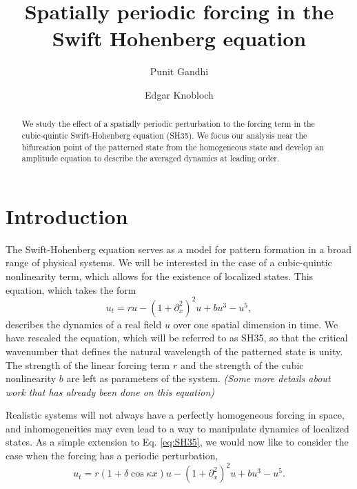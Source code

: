 \documentclass[api,pof,pre,12pt,a4paper]{revtex4-1}
\begin{document}

\title{Spatially periodic forcing in the Swift Hohenberg equation}

\author{Punit Gandhi}
\author{Edgar Knobloch}

\begin{abstract}
We study the effect of a spatially periodic perturbation to the forcing term in the cubic-quintic Swift-Hohenberg equation (SH35).  We focus our analysis near the bifurcation point of the patterned state from the homogeneous state and develop an amplitude equation to describe the averaged dynamics at leading order.  
\end{abstract}

\maketitle

\section{Introduction}
The Swift-Hohenberg equation serves as a model for pattern formation in a broad range of physical systems.  We will be interested in the case of a cubic-quintic nonlinearity term, which allows for the existence of localized states.  This equation, which takes the form  
\begin{equation}
u_t= r u-\left(1+\partial_{x}^2\right)^2u+bu^3-u^5\label{eq:SH35},
\end{equation}
describes the dynamics of a real field $u$ over one spatial dimension in time.  We have rescaled the equation, which will be referred to as SH35, so that the critical wavenumber that defines the natural wavelength of the patterned state is unity. The strength of the linear forcing term $r$ and the strength of the cubic nonlinearity $b$ are left as parameters of the system.  {\it (Some more details about work that has already been done on this equation)} 


Realistic systems will not always have a perfectly homogeneous forcing in space, and inhomogeneities may even lead to a way to manipulate dynamics of localized states. As a simple extension to Eq. \ref{eq:SH35}, we would now like to consider the case when the forcing has a periodic perturbation,
\begin{equation}
u_t= r(1+\delta \cos{\kappa x}) u -\left(1+\partial_{x}^2\right)^2u+bu^3-u^5\label{eq:SH35spf}.
\end{equation}
\end{document}
